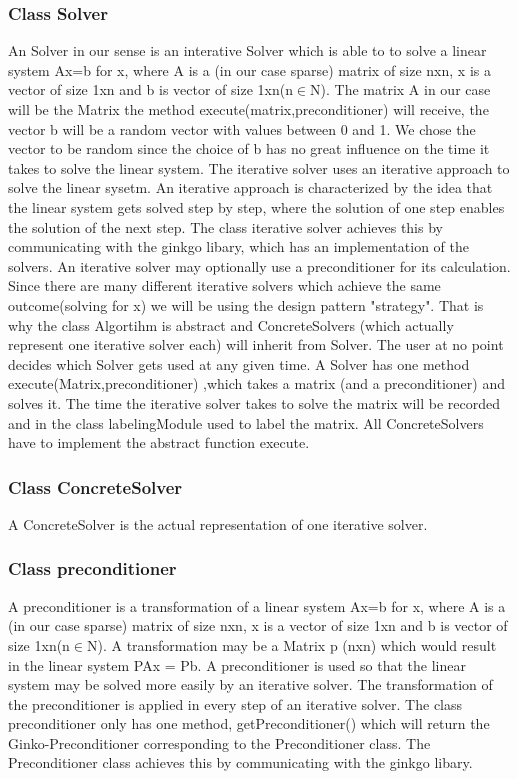 \documentclass[parskip=full]{scrartcl}
\begin{document}
\subsubsection{Class Solver}
An Solver in our sense is an interative Solver which is able to to solve a linear system Ax=b for x, where A is a (in our case sparse) matrix of size nxn, x is a vector of size 1xn and b is vector of size 1xn(n$\in$N).
The matrix A in our case will be the Matrix the method execute(matrix,preconditioner) will receive, the vector b will be a random vector with values between 0 and 1.
We chose the vector to be random since the choice of b has no great influence on the time it takes to solve the linear system.
The \gls{iterative solver} uses an iterative approach to solve the linear sysetm.
An iterative approach is characterized by the idea that the linear system gets solved step by step, where the solution of one step enables the solution of the next step.
The class \gls{iterative solver} achieves this by communicating with the ginkgo libary, which has an implementation of the solvers.
An \gls{iterative solver} may optionally use a \gls{preconditioner} for its calculation.
Since there are many different \gls{iterative solver}s which achieve the same outcome(solving for x) we will be using the design pattern "\gls{strategy}".
That is why the class Algortihm is abstract and ConcreteSolvers (which actually represent one \gls{iterative solver} each) will inherit from Solver.
The user at no point decides which Solver gets used at any given time. \newline
A Solver has one method execute(Matrix,\gls{preconditioner}) ,which takes a matrix (and a \gls{preconditioner}) and solves it.
The time the \gls{iterative solver} takes to solve the matrix will be recorded and in the class labelingModule used to label the matrix.
All ConcreteSolvers have to implement the abstract function execute.

\subsubsection{Class ConcreteSolver}
A ConcreteSolver is the actual representation of one \gls{iterative solver}.

\subsubsection{Class \gls{preconditioner}}
A \gls{preconditioner} is a transformation of a linear system Ax=b for x, where A is a (in our case sparse) matrix of size nxn, x is a vector of size 1xn and b is vector of size 1xn(n$\in$N).
A transformation may be a Matrix p (nxn) which would result in the linear system PAx = Pb.
A \gls{preconditioner} is used so that the linear system may be solved more easily by an \gls{iterative solver}.
The transformation of the \gls{preconditioner} is applied in every step of an \gls{iterative solver}. \newline\newline
The class \gls{preconditioner} only has one method, getPreconditioner() which will return the Ginko-Preconditioner corresponding to the Preconditioner class.
The Preconditioner class achieves this by communicating with the ginkgo libary.
\end{document}
